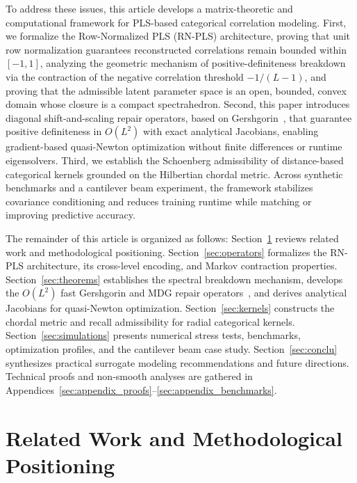 \documentclass[default,sn-mathphys,Numbered]{sn-jnl}
\theoremstyle{thmstyleone}
\theoremstyle{thmstylethree}
\theoremstyle{thmstyletwo}
\begin{document}
To address these issues, this article develops a matrix-theoretic and computational framework for PLS-based categorical correlation modeling. First, we formalize the Row-Normalized PLS (RN-PLS) architecture, proving that unit row normalization guarantees reconstructed correlations remain bounded within $[-1, 1]$, analyzing the geometric mechanism of positive-definiteness breakdown via the contraction of the negative correlation threshold $-1/(L-1)$, and proving that the admissible latent parameter space is an open, bounded, convex domain whose closure is a compact spectrahedron. Second, this paper introduces diagonal shift-and-scaling repair operators, based on Gershgorin~\citep{deville2019optimizing}, that guarantee positive definiteness in $O(L^2)$  with exact analytical Jacobians, enabling gradient-based quasi-Newton optimization without finite differences or runtime eigensolvers.
Third, we establish the Schoenberg admissibility of distance-based categorical kernels grounded on the Hilbertian chordal metric. Across synthetic benchmarks and a cantilever beam experiment, the framework stabilizes covariance conditioning and reduces training runtime while matching or improving predictive accuracy.

The remainder of this article is organized as follows: Section~\ref{sec:sota} reviews related work and methodological positioning. Section~\ref{sec:operators} formalizes the RN-PLS architecture, its cross-level encoding, and Markov contraction properties. Section~\ref{sec:theorems} establishes the spectral breakdown mechanism, develops the $O(L^2)$ fast Gershgorin and MDG repair operators~\citep{deville2019optimizing}, and derives analytical Jacobians for quasi-Newton optimization. Section~\ref{sec:kernels} constructs the chordal metric and recall admissibility for radial categorical kernels. Section~\ref{sec:simulations} presents numerical stress tests, benchmarks, optimization profiles, and the cantilever beam case study. Section~\ref{sec:conclu} synthesizes practical surrogate modeling recommendations and future directions. Technical proofs and non-smooth analyses are gathered in Appendices~\ref{sec:appendix_proofs}--\ref{sec:appendix_benchmarks}.

\section{Related Work and Methodological Positioning}
\label{sec:sota}
\end{document}
